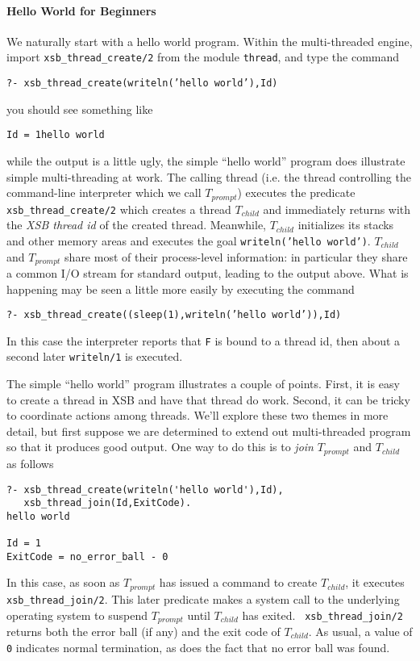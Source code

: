 \paragraph{Hello World for Beginners}
%
We naturally start with a hello world program.  Within the
multi-threaded engine, import {\tt xsb\_thread\_create/2} from the
module {\tt thread}, and type the command
\begin{center} 
{\tt ?- xsb\_thread\_create(writeln('hello world'),Id)} 
\end{center} 
you should see something like 
\begin{center} 
{\tt Id = 1hello world} 
\end{center} 
%
while the output is a little ugly, the simple ``hello world'' program
does illustrate simple multi-threading at work.  The calling thread
(i.e. the thread controlling the command-line interpreter which we
call $T_{prompt}$) executes the predicate {\tt xsb\_thread\_create/2}
which creates a thread $T_{child}$ and immediately returns with the
{\em XSB thread id} of the created thread.  Meanwhile, $T_{child}$
initializes its stacks and other memory areas and executes the goal
{\tt writeln('hello world')}.  $T_{child}$ and $T_{prompt}$ share most
of their process-level information: in particular they share a common
I/O stream for standard output, leading to the output above.  What is
happening may be seen a little more easily by executing the command
%
\begin{center} 
{\tt ?- xsb\_thread\_create((sleep(1),writeln('hello world')),Id)} 
\end{center} 
%
In this case the interpreter reports that {\tt F} is bound to a thread
id, then about a second later {\tt writeln/1} is executed.  

The simple ``hello world'' program illustrates a couple of points.
First, it is easy to create a thread in XSB and have that thread do
work.  Second, it can be tricky to coordinate actions among threads.
We'll explore these two themes in more detail, but first suppose we
are determined to extend out multi-threaded program so that it
produces good output.  One way to do this is to {\em join}
$T_{prompt}$ and $T_{child}$ as follows 
%
\begin{verbatim}
?- xsb_thread_create(writeln('hello world'),Id),
   xsb_thread_join(Id,ExitCode).
hello world

Id = 1
ExitCode = no_error_ball - 0
\end{verbatim}
%
In this case, as soon as $T_{prompt}$ has issued a command to create
$T_{child}$, it executes {\tt xsb\_thread\_join/2}.  This later
predicate makes a system call to the underlying operating system to
suspend $T_{prompt}$ until $T_{child}$ has exited.  {\tt
  xsb\_thread\_join/2} returns both the error ball (if any) and the
exit code of $T_{child}$.  As usual, a value of {\tt 0} indicates
normal termination, as does the fact that no error ball was found.

